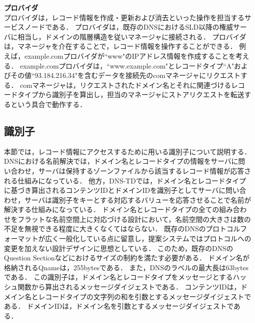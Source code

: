\hspace{-12pt}\textbf{プロバイダ}\\
\hspace{12pt}プロバイダは，レコード情報を作成・更新および消去といった操作を担当するサービスノードである．
プロバイダは，既存のDNSにおけるSLD以降の権威サーバに相当し，ドメインの階層構造を従いマネージャに接続される．
プロバイダは，マネージャを介在することで，レコード情報を操作することができる．
例えば，example.comプロバイダが``www"のIPアドレス情報を作成することを考える．
example.comプロバイダは，``www.example.com"とレコードタイプ``A"およびその値``93.184.216.34"を含むデータを接続先のcomマネージャにリクエストする．
comマネージャは，リクエストされたドメイン名とそれに関連づけるレコードタイプから識別子を算出し，担当のマネージャにストアリクエストを転送するという具合で動作する．

\subsection{識別子}
本節では，レコード情報にアクセスするために用いる識別子について説明する．
DNSにおける名前解決では，ドメイン名とレコードタイプの情報をサーバに問い合わせ，サーバは保持するゾーンファイルから該当するレコード情報が応答される仕組みになっている．
他方，DNS-TDでは，ドメイン名とレコードタイプに基づき算出されるコンテンツIDとドメインIDを識別子としてサーバに問い合わせ，サーバは識別子をキーとする対応するバリューを応答させることで名前が解決する仕組みになっている．
ドメイン名とレコードタイプの全ての組み合わせをフラットな名前空間上に対応づける設計において，名前空間の大きさは数の不足を無視できる程度に大きくなくてはならない．
既存のDNSのプロトコルフォーマットが広く一般化している点に留意し，提案システムではプロトコルへの変更を加えない設計デザインに思想としている．
このため，既存のDNSのQuestion Sectionなどにおけるサイズの制約を満たす必要がある．
ドメイン名が格納されるQnameは，255bytesである．
また，DNSのラベルの最大長は63bytesである．
この識別子は，ドメイン名とレコードタイプをメッセージとするハッシュ関数から算出されるメッセージダイジェストである．
コンテンツIDは，ドメイン名とレコードタイプの文字列の和を引数とするメッセージダイジェストである．
ドメインIDは，ドメイン名を引数とするメッセージダイジェストである．



